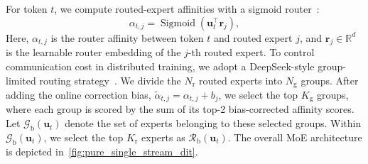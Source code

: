For token $t$, we compute routed-expert affinities with a sigmoid router~\cite{deepseek2024v3}:
\begin{equation}
\alpha_{t,j} = \operatorname{Sigmoid}\left(\mathbf{u}_t^\top \mathbf{r}_j\right),
\end{equation}
Here, $\alpha_{t,j}$ is the router affinity between token $t$ and routed expert $j$, and $\mathbf{r}_j \in \mathbb{R}^d$ is the learnable router embedding of the $j$-th routed expert. To control communication cost in distributed training, we adopt a DeepSeek-style group-limited routing strategy~\cite{deepseek2024v3}. We divide the $N_{\mathrm{r}}$ routed experts into $N_{\mathrm{g}}$ groups. After adding the online correction bias, $\tilde{\alpha}_{t,j} = \alpha_{t,j} + b_j$, we select the top $K_{\mathrm{g}}$ groups, where each group is scored by the sum of its top-2 bias-corrected affinity scores. Let $\mathcal{G}_{\mathrm{b}}(\mathbf{u}_t)$ denote the set of experts belonging to these selected groups. Within $\mathcal{G}_{\mathrm{b}}(\mathbf{u}_t)$, we select the top $K_{\mathrm{r}}$ experts as $\mathcal{R}_{\mathrm{b}}(\mathbf{u}_t)$. The overall MoE architecture is depicted in~\cref{fig:pure_single_stream_dit}.

